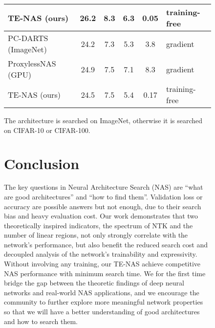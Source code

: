 \documentclass{article} \usepackage{iclr2021_conference,times}
\begin{document}
\begin{wrapfigure}{r}{65mm}
\begin{center}
\begin{table}[b!]
\begin{threeparttable}
\begin{tabular}{lcccc}
    TE-NAS (ours) & 26.2 & 8.3 & 6.3 & 0.05 & training-free \\ \midrule
    PC-DARTS (ImageNet) \citep{xu2019pc}\tnote{} & 24.2 & 7.3 & 5.3 & 3.8 & gradient \\
    ProxylessNAS (GPU) \citep{cai2018proxylessnas}\tnote{} & 24.9 & 7.5 & 7.1 & 8.3 & gradient \\
    TE-NAS (ours)\tnote{} & 24.5 & 7.5 & 5.4 & 0.17 & training-free \\ \bottomrule
    \end{tabular}
    \begin{tablenotes}
        \item[] The architecture is searched on ImageNet, otherwise it is searched on CIFAR-10 or CIFAR-100.
    \end{tablenotes}
    \end{threeparttable}
    \label{tab:imagenet}
    \vspace{-2.5mm}
\end{table}

\vspace{-0.5em}
\section{Conclusion}
\vspace{-0.5em}
The key questions in Neural Architecture Search (NAS) are ``what are good architectures'' and ``how to find them''. Validation loss or accuracy are possible answers but not enough, due to their search bias and heavy evaluation cost. Our work demonstrates that two theoretically inspired indicators, the spectrum of NTK and the number of linear regions, not only strongly correlate with the network's performance, but also benefit the reduced search cost and decoupled analysis of the network's trainability and expressivity. Without involving any training, our TE-NAS achieve competitive NAS performance with minimum search time. We for the first time bridge the gap between the theoretic findings of deep neural networks and real-world NAS applications, and we encourage the community to further explore more meaningful network properties so that we will have a better understanding of good architectures and how to search them.

\vspace{-0.5em}

\end{center}
\end{wrapfigure}
\end{document}
